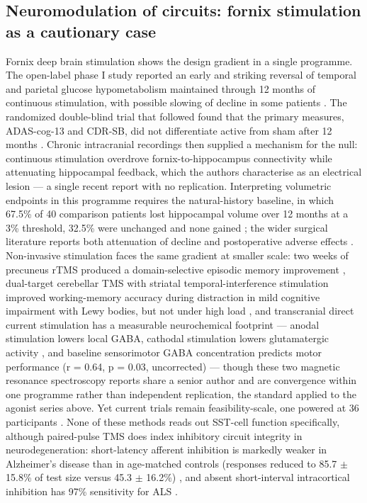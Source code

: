 \documentclass[11pt]{article}
\begin{document}
\subsection{Neuromodulation of circuits: fornix stimulation as a cautionary case}
\label{sec-10-neuromodulation}

Fornix deep brain stimulation shows the design gradient in a single programme. The open-label phase I study reported an early and striking reversal of temporal and parietal glucose hypometabolism maintained through 12 months of continuous stimulation, with possible slowing of decline in some patients \citep{Laxton2010}. The randomized double-blind trial that followed found that the primary measures, ADAS-cog-13 and CDR-SB, did not differentiate active from sham after 12 months \citep{Targum2021}. Chronic intracranial recordings then supplied a mechanism for the null: continuous stimulation overdrove fornix-to-hippocampus connectivity while attenuating hippocampal feedback, which the authors characterise as an electrical lesion \citep{Stanslaski2026} --- a single recent report with no replication. Interpreting volumetric endpoints in this programme requires the natural-history baseline, in which 67.5\% of 40 comparison patients lost hippocampal volume over 12 months at a 3\% threshold, 32.5\% were unchanged and none gained \citep{Germann2025}; the wider surgical literature reports both attenuation of decline and postoperative adverse effects \citep{Swietlik2024}. Non-invasive stimulation faces the same gradient at smaller scale: two weeks of precuneus rTMS produced a domain-selective episodic memory improvement \citep{Koch2018}, dual-target cerebellar TMS with striatal temporal-interference stimulation improved working-memory accuracy during distraction in mild cognitive impairment with Lewy bodies, but not under high load \citep{Nencha2026}, and transcranial direct current stimulation has a measurable neurochemical footprint --- anodal stimulation lowers local GABA, cathodal stimulation lowers glutamatergic activity \citep{Stagg2009}, and baseline sensorimotor GABA concentration predicts motor performance (r = 0.64, p = 0.03, uncorrected) \citep{Stagg2011} --- though these two magnetic resonance spectroscopy reports share a senior author and are convergence within one programme rather than independent replication, the standard applied to the agonist series above. Yet current trials remain feasibility-scale, one powered at 36 participants \citep{Kuo2026}. None of these methods reads out SST-cell function specifically, although paired-pulse TMS does index inhibitory circuit integrity in neurodegeneration: short-latency afferent inhibition is markedly weaker in Alzheimer's disease than in age-matched controls (responses reduced to 85.7 $\pm$ 15.8\% of test size versus 45.3 $\pm$ 16.2\%) \citep{DiLazzaro2002}, and absent short-interval intracortical inhibition has 97\% sensitivity for ALS \citep{Vucic2012}.
\end{document}
